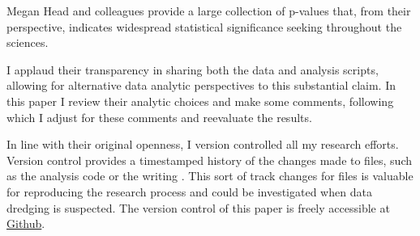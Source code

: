 Megan Head and colleagues provide a large collection of p-values that, from their perspective, indicates widespread statistical significance seeking throughout the sciences. 

I applaud their transparency in sharing both the data and analysis scripts, allowing for alternative data analytic perspectives to this substantial claim. In this paper I review their analytic choices and make some comments, following which I adjust for these comments and reevaluate the results.

In line with their original openness, I version controlled all my research efforts. Version control provides a timestamped history of the changes made to files, such as the analysis code or the writing \cite{Ram2013}. This sort of track changes for files is valuable for reproducing the research process and could be investigated when data dredging is suspected. The version control of this paper is freely accessible at \href{https://github.com/chartgerink/2015head}{Github}.